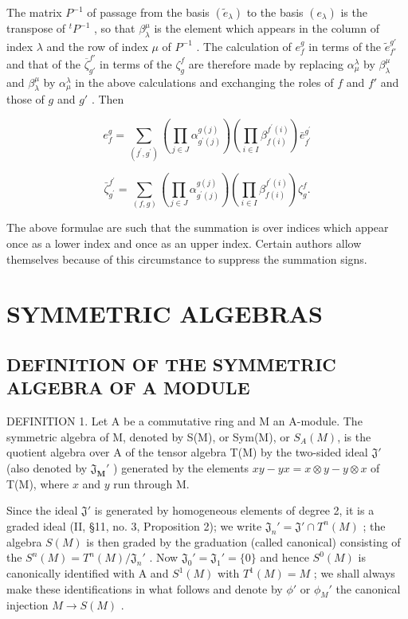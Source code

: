 The matrix \(P^{-1}\) of passage from the basis \((\tilde{e}_{\lambda})\) to the basis \((e_{\lambda})\) is the transpose of \(^{t}P^{-1}\) , so that \(\beta_{\lambda}^{\mu}\) is the element which appears in the column of index \(\lambda\) and the row of index \(\mu\) of \(P^{-1}\) . The calculation of \(e_{f}^{g}\) in terms of the \(\tilde{e}_{f'}^{g'}\) and that of the \(\overline{\zeta}_{g'}^{f'}\) in terms of the \(\zeta_{g}^{f}\) are therefore made by replacing \(\alpha_{\mu}^{\lambda}\) by \(\beta_{\lambda}^{\mu}\) and \(\beta_{\lambda}^{\mu}\) by \(\alpha_{\mu}^{\lambda}\) in the above calculations and exchanging the roles of \(f\) and \(f'\) and those of \(g\) and \(g'\) . Then

\[
e _ {f} ^ {g} = \sum_ {(f ^ {\prime}, g ^ {\prime})} \left(\prod_ {j \in J} \alpha_ {g ^ {\prime} (j)} ^ {g (j)}\right) \left(\prod_ {i \in I} \beta_ {f (i)} ^ {f ^ {\prime} (i)}\right) \bar {e} _ {f ^ {\prime}} ^ {g ^ {\prime}}\tag{22}
\]

\[
\bar {\zeta} _ {g ^ {\prime}} ^ {f ^ {\prime}} = \sum_ {(f, g)} \left(\prod_ {j \in J} \alpha_ {g ^ {\prime} (j)} ^ {g (j)}\right) \left(\prod_ {i \in I} \beta_ {f (i)} ^ {f ^ {\prime} (i)}\right) \zeta_ {g} ^ {f}.\tag{23}
\]

The above formulae are such that the summation is over indices which appear once as a lower index and once as an upper index. Certain authors allow themselves because of this circumstance to suppress the summation signs.

\section{SYMMETRIC ALGEBRAS}

\subsection{DEFINITION OF THE SYMMETRIC ALGEBRA OF A MODULE}

DEFINITION 1. Let A be a commutative ring and M an A-module. The symmetric algebra of M, denoted by S(M), or Sym(M), or \(S_{A}(M)\), is the quotient algebra over A of the tensor algebra T(M) by the two-sided ideal \(\mathfrak{J}'\) (also denoted by \(\mathfrak{J}_{\mathbf{M}}'\) ) generated by the elements \(xy - yx = x \otimes y - y \otimes x\) of T(M), where \(x\) and \(y\) run through M.

Since the ideal \(\mathfrak{J}'\) is generated by homogeneous elements of degree 2, it is a graded ideal (II, §11, no. 3, Proposition 2); we write \(\mathfrak{J}_n' = \mathfrak{J}' \cap T^n(M)\) ; the algebra \(S(M)\) is then graded by the graduation (called canonical) consisting of the \(S^n(M) = T^n(M)/\mathfrak{J}_n'\) . Now \(\mathfrak{J}_0' = \mathfrak{J}_1' = \{0\}\) and hence \(S^0(M)\) is canonically identified with A and \(S^1(M)\) with \(T^1(M) = M\) ; we shall always make these identifications in what follows and denote by \(\phi'\) or \(\phi_M'\) the canonical injection \(M \to S(M)\) .

